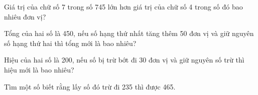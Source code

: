 \begin{ex}
Giá trị của chữ số 7 trong số 745 lớn hơn giá trị của chữ số 4 trong số đó bao nhiêu đơn vị?
\end{ex}

\begin{ex}
Tổng của hai số là 450, nếu số hạng thứ nhất tăng thêm 50 đơn vị và giữ nguyên số hạng thứ hai thì tổng mới là bao nhiêu?
\end{ex}

\begin{ex}
Hiệu của hai số là 200, nếu số bị trừ bớt đi 30 đơn vị và giữ nguyên số trừ thì hiệu mới là bao nhiêu?
\end{ex}

\begin{ex}
Tìm một số biết rằng lấy số đó trừ đi 235 thì được 465.
\end{ex}
